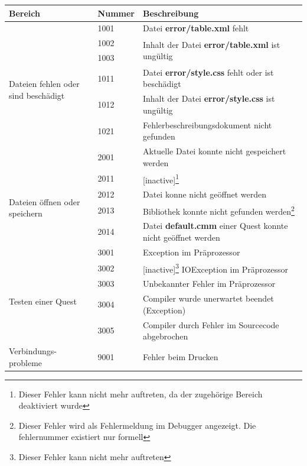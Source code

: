 \def\arraystretch{1.6}
\begin{minipage}{14cm}
\begin{tabular}{l|l|l}
	Bereich&Nummer&Beschreibung\\
	\hline
	&1001&Datei \textbf{error/table.xml} fehlt\\
	\multirow{5}{15mm}{\begin{sideways}\parbox{35mm}{Dateien fehlen oder sind beschädigt}\end{sideways}}&1002&\multirow{2}{*}{Inhalt der Datei \textbf{error/table.xml} ist ungültig}\\
	&1003&\\
	&1011&Datei \textbf{error/style.css} fehlt oder ist beschädigt\\
	&1012&Inhalt der Datei \textbf{error/style.css} ist ungültig\\
	&1021&Fehlerbeschreibungsdokument nicht gefunden\\
	\hline
	&2001&Aktuelle Datei konnte nicht gespeichert werden\\
	\multirow{4}{15mm}{\begin{sideways}\parbox{25mm}{Dateien öffnen oder speichern}\end{sideways}}&2011&[inactive]\footnote{Dieser Fehler kann nicht mehr auftreten, da der zugehörige Bereich deaktiviert wurde}\\
	&2012&Datei konne nicht geöffnet werden\\
	&2013&Bibliothek konnte nicht gefunden werden\footnote{Dieser Fehler wird als Fehlermeldung im Debugger angezeigt. Die fehlernummer existiert nur formell}\\%
	&2014&Datei \textbf{default.cmm} einer Quest konnte nicht geöffnet werden\\%
	\hline
	&3001&Exception im Präprozessor\\
	\multirow{4}{15mm}{\begin{sideways}\parbox{25mm}{Testen einer Quest}\end{sideways}}&3002&[inactive]\footnote{Dieser Fehler kann nicht mehr auftreten} IOException im Präprozessor\\
	&3003&Unbekannter Fehler im Präprozessor\\
	&3004&Compiler wurde unerwartet beendet (Exception)\\
	&3005&Compiler durch Fehler im Sourcecode abgebrochen\\
	\hline
	\parbox{23mm}{Verbindungs- probleme}&9001&Fehler beim Drucken
\end{tabular}
\end{minipage}

